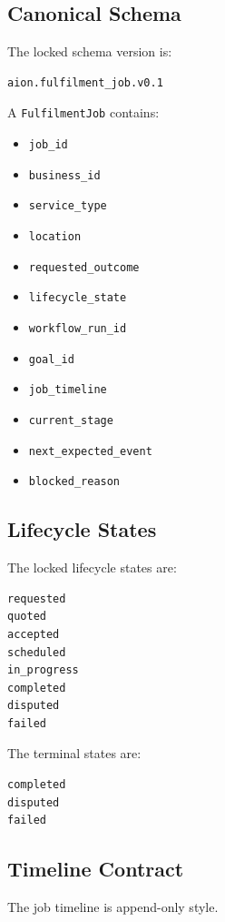 \subsection{Canonical Schema}

The locked schema version is:

\begin{verbatim}
aion.fulfilment_job.v0.1
\end{verbatim}

A \texttt{FulfilmentJob} contains:

\begin{itemize}
  \item \texttt{job\_id}
  \item \texttt{business\_id}
  \item \texttt{service\_type}
  \item \texttt{location}
  \item \texttt{requested\_outcome}
  \item \texttt{lifecycle\_state}
  \item \texttt{workflow\_run\_id}
  \item \texttt{goal\_id}
  \item \texttt{job\_timeline}
  \item \texttt{current\_stage}
  \item \texttt{next\_expected\_event}
  \item \texttt{blocked\_reason}
\end{itemize}

\subsection{Lifecycle States}

The locked lifecycle states are:

\begin{verbatim}
requested
quoted
accepted
scheduled
in_progress
completed
disputed
failed
\end{verbatim}

The terminal states are:

\begin{verbatim}
completed
disputed
failed
\end{verbatim}

\subsection{Timeline Contract}

The job timeline is append-only style.

